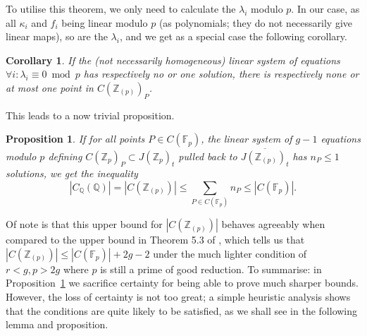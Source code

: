 \documentclass[12pt]{article}
\newcommand{\Z}{\mathbb{Z}}
\newcommand{\Q}{\mathbb{Q}}
\newcommand{\F}{\mathbb{F}}
\theoremstyle{plain}
\newtheorem{cor}[thm]{Corollary} %
\newtheorem{prop}[thm]{Proposition} %
\theoremstyle{definition}
\theoremstyle{remark}
\begin{document}
To utilise this theorem, we only need to calculate the $\lambda_i$ modulo $p$. In our case, as all $\kappa_i$ and $f_i$ being linear modulo $p$ (as polynomials; they do not necessarily give linear maps), so are the $\lambda_i$, and we get as a special case the following corollary.
\begin{cor}
\label{cor:finedixlinear}
If the (not necessarily homogeneous) linear system of equations $\forall i: \lambda_i \equiv 0 \bmod p$ has respectively no or one solution, there is respectively none or at most one point in $C(\Z_{(p)})_P$.
\end{cor}

This leads to a now trivial proposition.
\begin{prop}
\label{prop:linchabauty}
If for all points $P \in C(\F_p)$, the linear system of $g-1$ equations modulo $p$ defining $C(\Z_p)_P \subset J(\Z_p)_t$ pulled back to $\overline{J(\Z_{(p)})_t}$ has $n_P \leq 1$ solutions, we get the inequality
\[
|C_{\Q}(\Q)| = |C(\Z_{(p)})| \leq \sum_{P \in C(\F_p)} n_P \leq |C(\F_p)|. 
\]
\end{prop}

Of note is that this upper bound for $|C(\Z_{(p)})|$ behaves agreeably when compared to the upper bound in Theorem 5.3 of \cite{poonen12}, which tells us that $|C(\Z_{(p)})| \leq |C(\F_p)| + 2g-2$ under the much lighter condition of $r < g, p > 2g$ where $p$ is still a prime of good reduction. To summarise: in Proposition~\ref{prop:linchabauty} we sacrifice certainty for being able to prove much sharper bounds. However, the loss of certainty is not too great; a simple heuristic analysis shows that the conditions are quite likely to be satisfied, as we shall see in the following lemma and proposition.
\end{document}
